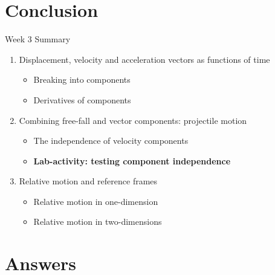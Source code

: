 \documentclass{beamer}
\begin{document}
\section{Conclusion}

\begin{frame}{Week 3 Summary}
\begin{enumerate}
\item Displacement, velocity and acceleration vectors \alert{as functions of time}
\begin{itemize}
\item Breaking into components
\item Derivatives of components
\end{itemize}
\item Combining free-fall and vector components: \alert{projectile motion}
\begin{itemize}
\item The independence of velocity components
\item \textbf{Lab-activity: testing component independence}
\end{itemize}
\item Relative motion and reference frames
\begin{itemize}
\item Relative motion in one-dimension
\item Relative motion in two-dimensions
\end{itemize}
\end{enumerate}
\end{frame}

\section{Answers}
\end{document}
